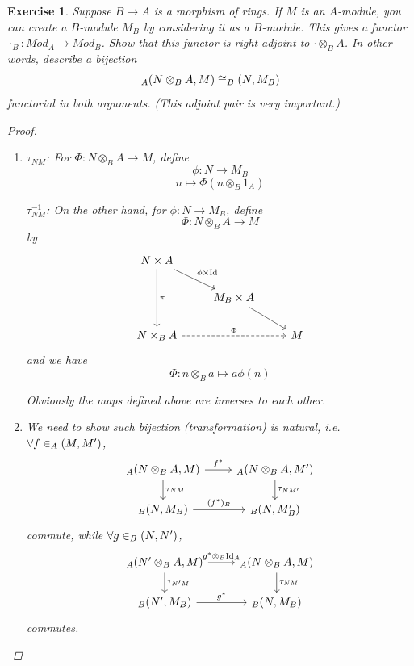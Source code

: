 \documentclass{article}
\theoremstyle{breakstyle}
\newtheorem{exercise}{Exercise}[section]
\DeclareMathOperator{\id}{Id}
\let\hom\relax
\DeclareMathOperator{\hom}{Hom}
\begin{document}
\begin{exercise}
Suppose $B \rightarrow A$ is a morphism of rings. If $M$ is an $A$-module,
you can create a $B$-module $M_{B}$ by considering it as a $B$-module. This
gives a functor $\cdot_{B}: Mod_{A} \rightarrow Mod_{B}$. Show that this
functor is right-adjoint to $\cdot \otimes_{B} A$. In other words, describe
a bijection
$$
\hom_{A}(N \otimes_{B} A, M) \cong \hom_{B}(N, M_{B})
$$
functorial in both arguments. (This adjoint pair is very important.)

\begin{proof}
    \begin{enumerate}[label=({\Roman*})]
        \item 
            $\tau_{NM}$:
            For $\Phi:N\otimes _{B}A\longrightarrow M$, define
            $$
            \phi:N\longrightarrow M_{B}
            $$
            $$
            n\longmapsto \Phi\left( n\otimes _{B}1_{A} \right) 
            $$
            
            $\tau_{NM}^{-1}$:
            On the other hand, for $\phi:N\longrightarrow M_{B}$, define
            $$
            \Phi:N\otimes _{B}A\longrightarrow M
            $$
            by
            $$
            \begin{tikzcd}
            N\times A \arrow[rd, "\phi\times\id"] \arrow[dd, "\pi"] &                          &   \\
                                                                    & M_{B}\times A \arrow[rd] &   \\
            N\times_{B}A \arrow[rr, "\Phi", dashed]                 &                          & M
            \end{tikzcd}
            $$
            and we have
            $$
            \Phi:n\otimes _{B}a\longmapsto a\phi\left( n \right) 
            $$

            Obviously the maps defined above are inverses to each other.
        \item 
            We need to show such bijection (transformation) is natural, i.e.
            $\forall f\in \hom_{A}\left( M,M' \right)$,
            $$
            \begin{tikzcd}
            {\hom_{A}(N\otimes_{B}A,M)} \arrow[d, "\tau_{NM}"] \arrow[r,"f^{*}"] & {\hom_{A}(N\otimes_{B}A,M')} \arrow[d, "\tau_{NM'}"] \\
            {\hom_{B}(N,M_{B})} \arrow[r, "(f^{*})_{B}"]                          & {\hom_{B}(N,M'_{B})}                               
            \end{tikzcd}
            $$
            commute, while $\forall g\in \hom_{B}\left( N,N' \right) $,
            $$
            \begin{tikzcd}
            {\hom_{A}(N'\otimes_{B}A,M)} \arrow[d, "\tau_{N'M}"] \arrow[r,"g^{*}\otimes_{B}\id_{A}"] & {\hom_{A}(N\otimes_{B}A,M)} \arrow[d, "\tau_{NM}"] \\
            {\hom_{B}(N',M_{B})} \arrow[r, "g^{*}"]                                                   & {\hom_{B}(N,M_{B})}                              
            \end{tikzcd}
            $$
            commutes.


\end{enumerate}
\end{proof}
\end{exercise}
\end{document}
